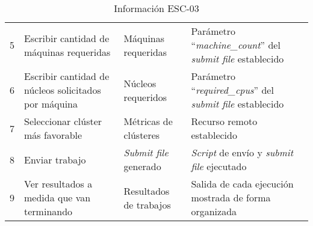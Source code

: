 \begin{table}[H]
\begin{tabular}{|p{2cm}|p{4cm}|p{2.5cm}|p{4.7cm}|}
		5                                       & Escribir cantidad de máquinas requeridas                      & Máquinas requeridas             & Parámetro ``\textit{machine\_count}'' del \textit{submit file} establecido \\
		6                                       & Escribir cantidad de núcleos solicitados por máquina          & Núcleos requeridos              & Parámetro ``\textit{required\_cpus}'' del \textit{submit file} establecido \\
		7                                       & Seleccionar clúster más favorable                             & Métricas de clústeres           & Recurso remoto establecido                                                 \\
		8                                       & Enviar trabajo                                                & \textit{Submit file} generado   & \textit{Script} de envío y \textit{submit file} ejecutado                  \\
		9                                       & Ver resultados a medida que van terminando                    & Resultados de trabajos          & Salida de cada ejecución mostrada de forma organizada                      \\
		\hline
	\end{tabular}
	\caption{Información ESC-03}
	\label{table:esc-03}
\end{table}
